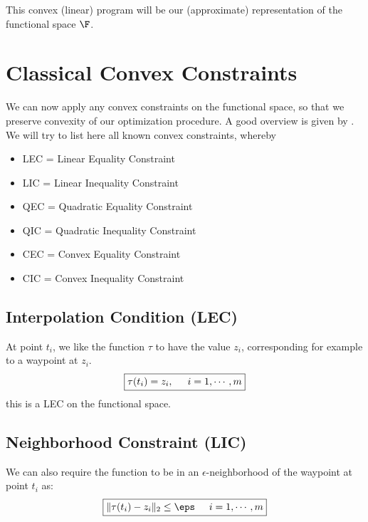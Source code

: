 \documentclass{article}
\begin{document}
This convex (linear) program will be our (approximate) representation of the functional
space $\F$. 

\newpage
\section{Classical Convex Constraints}
We can now apply any convex constraints on the functional space, so
that we preserve convexity of our optimization procedure. A good overview is
given by \cite{boyd}. We will try to list here all known convex constraints, whereby
\begin{itemize}
        \item LEC = Linear Equality Constraint
        \item LIC = Linear Inequality Constraint
        \item QEC = Quadratic Equality Constraint
        \item QIC = Quadratic Inequality Constraint
        \item CEC = Convex Equality Constraint
        \item CIC = Convex Inequality Constraint
\end{itemize}

\subsection{Interpolation Condition (LEC)}
At point $t_i$, we like the function $\tau$ to have the value $z_i$,
corresponding for example to a waypoint at $z_i$. 
\begin{equation}
        \begin{aligned}
                \boxed{\tau(t_i) = z_i, \hspace{0.5cm}i=1,\cdots,m}
        \end{aligned}
\end{equation}
this is a LEC on the functional space.

\subsection{Neighborhood Constraint (LIC)}

We can also require the
function to be in an $\epsilon$-neighborhood of the waypoint at point $t_i$ as:
\begin{equation}
        \begin{aligned}
                \boxed{\|\tau(t_i) - z_i\|_2 \leq \eps \hspace{0.5cm}i=1,\cdots,m}
        \end{aligned}
\end{equation}
\end{document}

